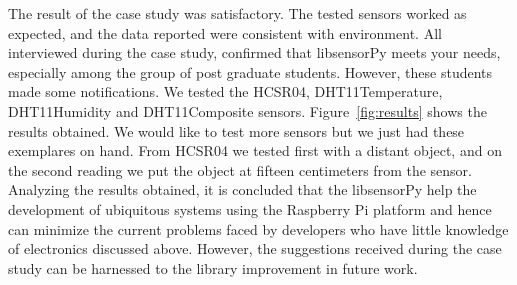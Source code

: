 \documentclass{acm_proc_article-sp}
\begin{document}
The result of the case study was satisfactory. The tested sensors worked as expected, and the data reported were consistent with environment. All interviewed during the case study, confirmed that libsensorPy meets your needs, especially among the group of post graduate students. However, these students made some notifications.
\newline
\newline
We tested the HCSR04, DHT11Temperature, DHT11Humidity and DHT11Composite sensors. Figure~\ref{fig:results} shows the results obtained. We would like to test more sensors but we just had these exemplares on hand. From HCSR04 we tested first with a distant object, and on the second reading we put the object at fifteen centimeters from the sensor.
\newline
\newline
Analyzing the results obtained, it is concluded that the libsensorPy help the development of ubiquitous systems using the Raspberry Pi platform and hence can minimize the current problems faced by developers who have little knowledge of electronics discussed above. However, the suggestions received during the case study can be harnessed to the library improvement in future work.
\end{document}
